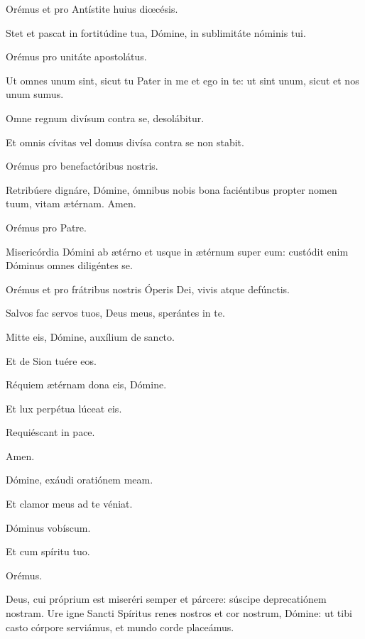 \begin{multicols}{2}
\bigskip
 \va  Orémus et pro Antístite huius di\oe césis.
 
 \ra Stet et pascat in fortitúdine tua, Dómine, in sublimitáte nóminis tui.
  
\bigskip
 \va  Orémus pro unitáte apostolátus.
 
 \ra Ut omnes unum sint, sicut tu Pater in me et ego in te: ut sint unum, sicut et nos unum sumus.
  
\bigskip
 \va  Omne regnum divísum contra se, desolábitur.
 
 \ra Et omnis cívitas vel domus divísa contra se non stabit.
  
\bigskip
 \va  Orémus pro benefactóribus nostris.
 
 \ra Retribúere dignáre, Dómine, ómnibus nobis bona faciéntibus propter nomen tuum, vitam ætérnam. Amen.
  
\bigskip
 \va  Orémus pro Patre.
 
 \ra Misericórdia Dómini ab ætérno et usque in ætérnum super eum: custódit enim Dóminus omnes diligéntes se.
  
\bigskip
 \va  Orémus et pro frátribus nostris Óperis Dei, vivis atque defúnctis.
 
 \ra Salvos fac servos tuos, Deus meus, sperántes in te.
 
 
\bigskip 
 \va  Mitte eis, Dómine, auxílium de sancto.
 
 \ra Et de Sion tuére eos.
  
\bigskip
 \va  Réquiem ætérnam dona eis, Dómine.
 
 \ra Et lux perpétua lúceat eis.
  
\bigskip 
\va Requiéscant in pace.

 \ra Amen.
  
\bigskip
 \va  Dómine, exáudi oratiónem meam.
 
 \ra Et clamor meus ad te véniat.
   
\bigskip


\bigskip
 \va  Dóminus vobíscum.
 
 \ra Et cum spíritu tuo.
 
\bigskip
 Orémus.
 
 Deus, cui próprium est miseréri semper et párcere: súscipe deprecatiónem nostram. Ure igne Sancti Spíritus renes nostros et cor nostrum, Dómine: ut tibi cas\-to córpore serviámus, et mundo corde placeámus.
 

\end{multicols}
